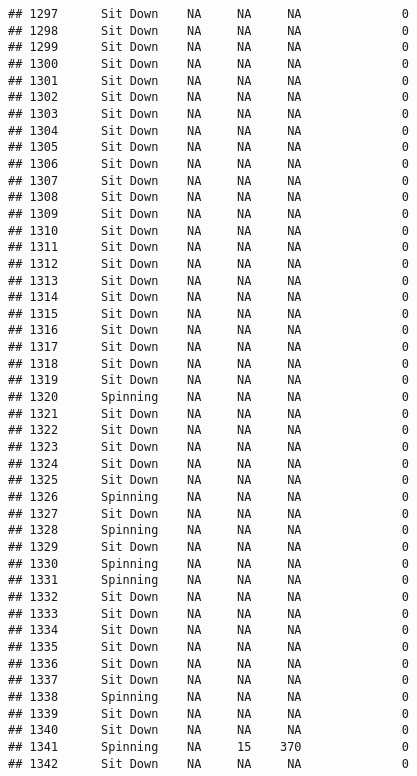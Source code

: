 \documentclass[
]{article}
\begin{document}
\begin{verbatim}
## 1297      Sit Down    NA     NA     NA              0
## 1298      Sit Down    NA     NA     NA              0
## 1299      Sit Down    NA     NA     NA              0
## 1300      Sit Down    NA     NA     NA              0
## 1301      Sit Down    NA     NA     NA              0
## 1302      Sit Down    NA     NA     NA              0
## 1303      Sit Down    NA     NA     NA              0
## 1304      Sit Down    NA     NA     NA              0
## 1305      Sit Down    NA     NA     NA              0
## 1306      Sit Down    NA     NA     NA              0
## 1307      Sit Down    NA     NA     NA              0
## 1308      Sit Down    NA     NA     NA              0
## 1309      Sit Down    NA     NA     NA              0
## 1310      Sit Down    NA     NA     NA              0
## 1311      Sit Down    NA     NA     NA              0
## 1312      Sit Down    NA     NA     NA              0
## 1313      Sit Down    NA     NA     NA              0
## 1314      Sit Down    NA     NA     NA              0
## 1315      Sit Down    NA     NA     NA              0
## 1316      Sit Down    NA     NA     NA              0
## 1317      Sit Down    NA     NA     NA              0
## 1318      Sit Down    NA     NA     NA              0
## 1319      Sit Down    NA     NA     NA              0
## 1320      Spinning    NA     NA     NA              0
## 1321      Sit Down    NA     NA     NA              0
## 1322      Sit Down    NA     NA     NA              0
## 1323      Sit Down    NA     NA     NA              0
## 1324      Sit Down    NA     NA     NA              0
## 1325      Sit Down    NA     NA     NA              0
## 1326      Spinning    NA     NA     NA              0
## 1327      Sit Down    NA     NA     NA              0
## 1328      Spinning    NA     NA     NA              0
## 1329      Sit Down    NA     NA     NA              0
## 1330      Spinning    NA     NA     NA              0
## 1331      Spinning    NA     NA     NA              0
## 1332      Sit Down    NA     NA     NA              0
## 1333      Sit Down    NA     NA     NA              0
## 1334      Sit Down    NA     NA     NA              0
## 1335      Sit Down    NA     NA     NA              0
## 1336      Sit Down    NA     NA     NA              0
## 1337      Sit Down    NA     NA     NA              0
## 1338      Spinning    NA     NA     NA              0
## 1339      Sit Down    NA     NA     NA              0
## 1340      Sit Down    NA     NA     NA              0
## 1341      Spinning    NA     15    370              0
## 1342      Sit Down    NA     NA     NA              0

\end{verbatim}
\end{document}
